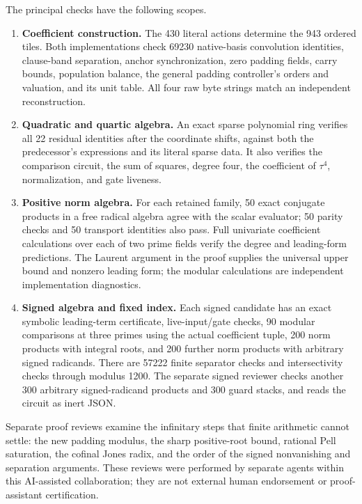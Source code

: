 The principal checks have the following scopes.
\begin{enumerate}
\item \textbf{Coefficient construction.} The 430 literal actions determine
the 943 ordered tiles. Both implementations check 69230 native-basis
convolution identities, clause-band separation, anchor synchronization,
zero padding fields, carry bounds, population balance, the general
padding controller's orders and valuation, and its unit table. All four
raw byte strings match an independent reconstruction.
\item \textbf{Quadratic and quartic algebra.} An exact sparse polynomial
ring verifies all 22 residual identities after the coordinate shifts,
against both the predecessor's expressions and its literal sparse data.
It also verifies the comparison circuit, the sum of squares, degree four,
the coefficient of $\tau^4$, normalization, and gate liveness.
\item \textbf{Positive norm algebra.} For each retained family, 50 exact
conjugate products in a free radical algebra agree with the scalar
evaluator; 50 parity checks and 50 transport identities also pass.
Full univariate coefficient calculations over each of two prime fields
verify the degree and leading-form predictions. The Laurent argument in
the proof supplies the universal upper bound and nonzero leading form;
the modular calculations are independent implementation diagnostics.
\item \textbf{Signed algebra and fixed index.} Each signed candidate has
an exact symbolic leading-term certificate, live-input/gate checks,
90 modular comparisons at three primes using the actual coefficient
tuple, 200 norm products with integral roots, and 200 further norm
products with arbitrary signed radicands. There are 57222 finite
separator checks and intersectivity checks through modulus 1200.
The separate signed reviewer checks another 300 arbitrary signed-radicand
products and 300 guard stacks, and reads the circuit as inert JSON.
\end{enumerate}

Separate proof reviews examine the infinitary steps that finite arithmetic
cannot settle: the new padding modulus, the sharp positive-root bound,
rational Pell saturation, the cofinal Jones radix, and the order of the
signed nonvanishing and separation arguments. These reviews were performed
by separate agents within this AI-assisted collaboration; they are not
external human endorsement or proof-assistant certification.

